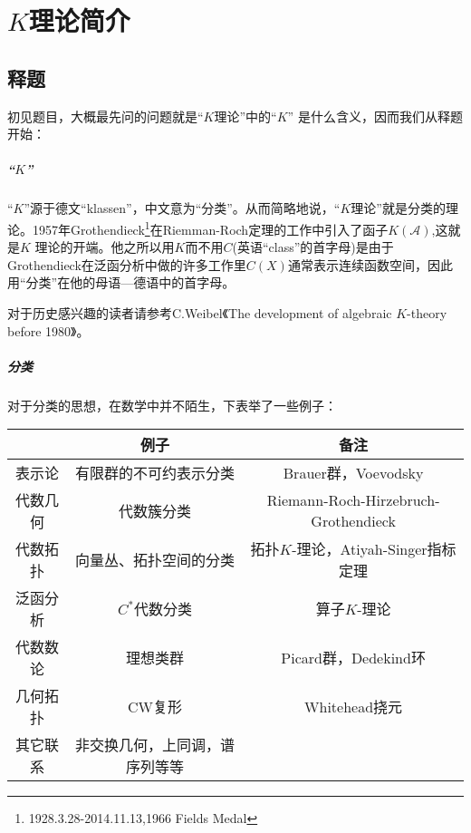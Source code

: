 % 

\chapter{$K$理论简介}
\section{释题}
初见题目，大概最先问的问题就是“$K$理论”中的“$K$” 是什么含义，因而我们从释题开始：
\paragraph{“$K$”}
“$K$”源于德文“klassen”，中文意为“分类”。从而简略地说，“$K$理论”就是分类的理论。1957年Grothendieck\footnote{1928.3.28-2014.11.13,1966 Fields Medal}在Riemman-Roch定理的工作中引入了函子$K(\mathcal {A})$,这就是$K$ 理论的开端。他之所以用$K$而不用$C$(英语“class”的首字母)是由于Grothendieck在泛函分析中做的许多工作里$C(X)$通常表示连续函数空间，因此用“分类”在他的母语---德语中的首字母。

对于历史感兴趣的读者请参考C.Weibel《The development of algebraic  $K$-theory before 1980》\cite{MR2000m:19001}。

\paragraph{分类}
对于分类的思想，在数学中并不陌生，下表举了一些例子：\\
\begin{tabular}{c|c|c}
 &例子 &备注\\
 \hline
 表示论&有限群的不可约表示分类 & Brauer群，Voevodsky \\
\hline
代数几何	&代数簇分类&Riemann-Roch-Hirzebruch-Grothendieck\\
\hline
代数拓扑 &向量丛、拓扑空间的分类 &拓扑$K$-理论，Atiyah-Singer指标定理\\
\hline
泛函分析 &$C^*$代数分类&算子$K$-理论 \\
\hline
代数数论 &理想类群 &Picard群，Dedekind环\\
\hline
几何拓扑 &CW复形 &Whitehead挠元\\
\hline
其它联系&  非交换几何，上同调，谱序列等等\\

\end{tabular}

